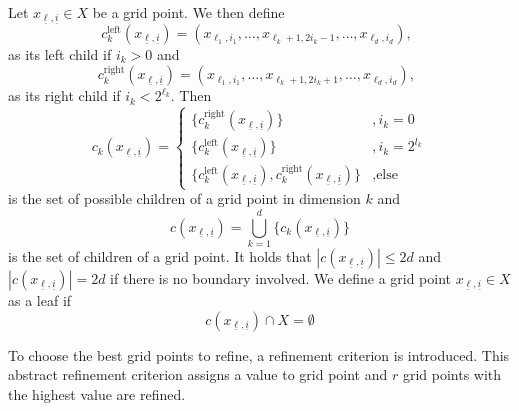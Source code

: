 \documentclass[
  a4paper,  %
  twoside,  %
  bibliography=totoc,
  headsepline,
  cleardoublepage=empty,
  parskip=half,
  draft=false
]{scrbook}
\begin{document}
\begin{definition}
Let $x_{\underline{\ell},\underline{i}} \in X$ be a grid point.
We then define
\begin{equation}
c_{k}^{\text{left}}(x_{\underline{\ell},\underline{i}})=(x_{\ell_1,i_1}, \dots, x_{\ell_k + 1,2  i_k - 1}, \dots, x_{\ell_d,i_d}), ~~ 
\end{equation}
as its left child if $i_k > 0$ and
\begin{equation}
c_{k}^{\text{right}}(x_{\underline{\ell},\underline{i}})=(x_{\ell_1,i_1}, \dots, x_{\ell_k + 1,2  i_k + 1}, \dots, x_{\ell_d,i_d}), ~~ 
\end{equation}
as its right child if $i_k < 2^{\ell_k}$.
Then
\begin{equation}
c_{k}(x_{\underline{\ell},\underline{i}})=
\begin{cases}
\{c_{k}^{\text{right}}(x_{\underline{\ell},\underline{i}})\}&, i_k=0\\
\{c_{k}^{\text{left}}(x_{\underline{\ell},\underline{i}})\}&,i_k= 2^{l_k}\\
\{c_{k}^{\text{left}}(x_{\underline{\ell},\underline{i}}),c_{k}^{\text{right}}(x_{\underline{\ell},\underline{i}}) \}&, \text{else}
\end{cases}
\end{equation}
is the set of possible children of a grid point in dimension $k$ and 
\begin{equation}
c(x_{\underline{\ell},\underline{i}})= \bigcup_{k=1}^d \{c_{k}(x_{\underline{\ell},\underline{i}})\}
\end{equation}
is the set of children of a grid point. It holds that $|c(x_{\underline{\ell},\underline{i}})| \leq 2d$ and $|c(x_{\underline{\ell},\underline{i}})| =2d$ if there is no boundary involved.
We define a grid point $x_{\underline{\ell},\underline{i}} \in X$ as a leaf if
\begin{equation}
c(x_{\underline{\ell},\underline{i}}) \cap X = \emptyset
\end{equation}
\end{definition}

To choose the best grid points to refine, a refinement criterion is introduced.
This abstract refinement criterion assigns a value to grid point and $r$ grid points with the highest value are refined.
\end{document}
